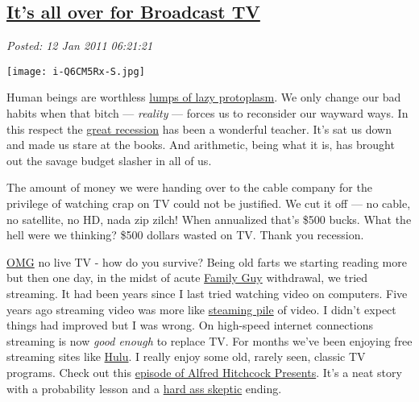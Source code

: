 %

\subsection*{\href{https://bakerjd99.wordpress.com/2011/01/12/its-all-over-for-broadcast-tv/}{It's all over for Broadcast TV}}


\noindent\emph{Posted: 12 Jan 2011 06:21:21}
\vspace{6pt}


\captionsetup[floatingfigure]{labelformat=empty}
\begin{floatingfigure}[l]{0.25\textwidth}
\centering
\texttt{[image: i-Q6CM5Rx-S.jpg]}
\label{fig:996X0}
\end{floatingfigure}Human
beings are worthless
\href{http://www.independent.ie/lifestyle/independent-woman/love-sex/why-do-successful-women-settle-for-lazy-lumps-1587083.html}{lumps
of lazy protoplasm}. We only change our bad habits when that bitch ---
\emph{reality} --- forces us to reconsider our wayward ways. In this
respect the
\href{http://www.theatlanticwire.com/opinions/view/opinion/It-Will-Take-Years-for-Your-Paycheck-to-Recover-From-the-Great-Recession-6523}{great
recession} has been a wonderful teacher. It's sat us down and made us
stare at the books. And arithmetic, being what it is, has brought out
the savage budget slasher in all of us.

The amount of money we were handing over to the cable company for the
privilege of watching crap on TV could not be justified. We cut it off
--- no cable, no satellite, no HD, nada zip zilch! When annualized
that's \$500 bucks. What the hell were we thinking? \$500 dollars wasted
on TV. Thank you recession.

\href{http://en.wikipedia.org/wiki/OMG\_They\_Killed\_Kenny}{OMG} no
live TV - how do you survive? Being old farts we starting reading more
but then one day, in the midst of acute
\href{http://www.hulu.com/family-guy}{Family Guy} withdrawal, we tried
streaming. It had been years since I last tried watching video on
computers. Five years ago streaming video was more like
\href{http://www.thebestpageintheuniverse.net/c.cgi?u=episode3}{steaming
pile} of video. I didn't expect things had improved but I was wrong. On
high-speed internet connections streaming is now \emph{good enough} to
replace TV. For months we've been enjoying free streaming sites like
\href{http://www.hulu.com/}{Hulu}. I really enjoy some old, rarely seen,
classic TV programs. Check out this
\href{http://www.hulu.com/embed/sp1x3wBXdMfrNzCrDGiIYg}{episode of
Alfred Hitchcock Presents}. It's a neat story with a probability lesson
and a
\href{http://bakerjd99.wordpress.com/2009/10/29/hard-ass-skeptic-rules/}{hard
ass skeptic} ending.



%